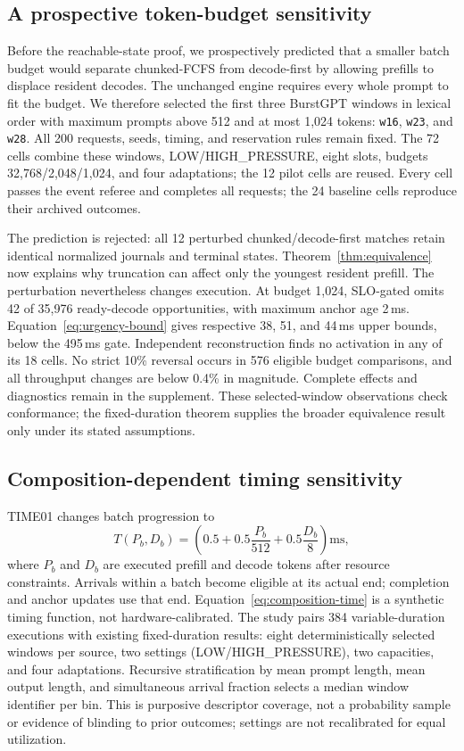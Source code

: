 \subsection{A prospective token-budget sensitivity}\label{sec:budget}
Before the reachable-state proof, we prospectively predicted that a smaller
batch budget would separate chunked-FCFS from decode-first by allowing
prefills to displace resident decodes. The unchanged engine requires every
whole prompt to fit the budget. We therefore selected the first three
BurstGPT windows in lexical order with maximum prompts above 512 and at
most 1,024 tokens: \texttt{w16}, \texttt{w23}, and \texttt{w28}.
All 200 requests, seeds, timing, and reservation rules remain fixed. The
72 cells combine these windows, LOW/HIGH\_PRESSURE, eight slots, budgets
32,768/2,048/1,024, and four adaptations; the 12 pilot cells are reused.
Every cell passes the event referee and completes all requests; the 24
baseline cells reproduce their archived outcomes.

The prediction is rejected: all 12 perturbed chunked/decode-first matches
retain identical normalized journals and terminal states. Theorem~\ref{thm:equivalence}
now explains why truncation can affect only the youngest resident prefill.
The perturbation nevertheless changes execution. At budget 1,024,
SLO-gated omits 42 of 35,976 ready-decode opportunities, with maximum anchor
age 2\,ms. Equation~\ref{eq:urgency-bound} gives respective 38, 51, and
44\,ms upper bounds, below the 495\,ms gate. Independent reconstruction
finds no activation in any of its 18 cells. No strict 10\% reversal occurs
in 576 eligible budget comparisons, and all throughput changes are below
0.4\% in magnitude. Complete effects and diagnostics remain in the
supplement. These selected-window observations check conformance; the
fixed-duration theorem supplies the broader equivalence result only under
its stated assumptions.

\subsection{Composition-dependent timing sensitivity}\label{sec:timing}
TIME01 changes batch progression to
\begin{equation}\label{eq:composition-time}
 T(P_b,D_b)=\left(0.5+0.5\frac{P_b}{512}+0.5\frac{D_b}{8}\right)\mathrm{ms},
\end{equation}
where $P_b$ and $D_b$ are executed prefill and decode tokens after resource
constraints. Arrivals within a batch become eligible at its actual end;
completion and anchor updates use that end. Equation~\ref{eq:composition-time}
is a synthetic timing function, not hardware-calibrated.
The study pairs 384 variable-duration executions with existing fixed-duration
results: eight deterministically selected windows per source, two settings
(LOW/HIGH\_PRESSURE), two capacities, and four adaptations. Recursive
stratification by mean prompt length, mean output length, and simultaneous
arrival fraction selects a median window identifier per bin. This is
purposive descriptor coverage, not a probability sample or evidence of
blinding to prior outcomes; settings are not recalibrated for equal utilization.

